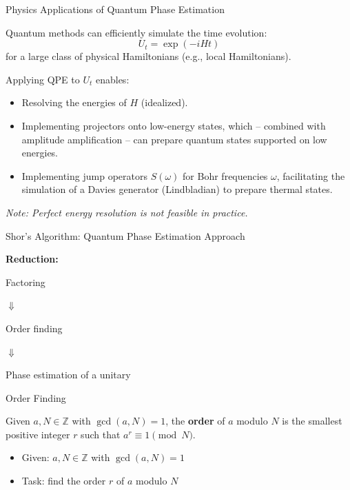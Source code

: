 \documentclass[handout]{beamer} %
\newcommand{\Z}{{\mathbb{Z}}}
\renewcommand{\>}{\rangle}
\newcommand{\<}{\langle}
\theoremstyle{definition}
\begin{document}
\begin{frame}{Physics Applications of Quantum Phase Estimation}

Quantum methods can efficiently simulate the time evolution:
\[
U_t = \exp(-i H t)
\]
for a large class of physical Hamiltonians (e.g., local Hamiltonians).

\bigskip
Applying QPE to $U_t$ enables:

\begin{itemize}
    \item Resolving the energies of $H$ (idealized).

    \medskip
    \item Implementing projectors onto low-energy states, which -- combined with amplitude amplification -- can prepare quantum states supported on low energies.

    \medskip
    \item Implementing jump operators $S(\omega)$ for Bohr frequencies $\omega$, facilitating the simulation of a Davies generator (Lindbladian) to prepare thermal states.
\end{itemize}

\smallskip
\textit{Note: Perfect energy resolution is not feasible in practice.}
\end{frame}



\begin{frame}{Shor's Algorithm: Quantum Phase Estimation Approach}

\textbf{Reduction:}

\medskip
Factoring

\quad \quad $\Downarrow$ 

Order finding

\quad \quad $\Downarrow$ 

Phase estimation of a unitary 

\end{frame}



\begin{frame}{Order Finding}

Given $a,N \in \Z$ with $\gcd(a,N)=1$, the \textbf{order} of $a$ modulo $N$ is the smallest positive integer $r$ such that $a^r \equiv 1 \pmod N$.

\bigskip

\begin{itemize}
\item Given: $a,N \in \Z$ with $\gcd(a,N)=1$

\medskip
\item Task: find the order $r$ of $a$ modulo $N$
\end{itemize}

\end{frame}
\end{document}
